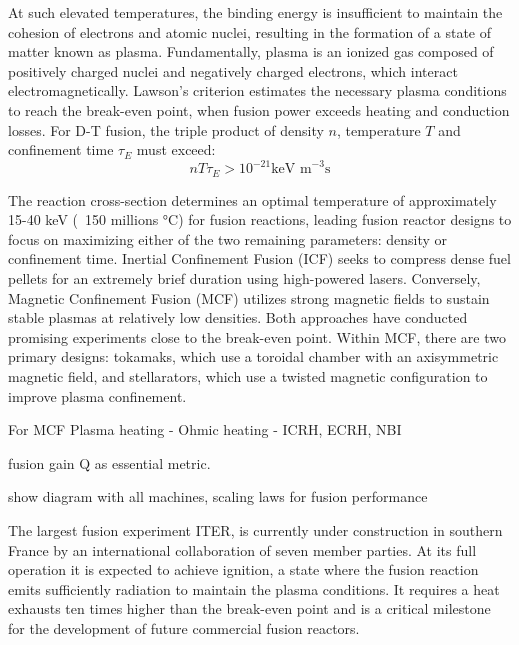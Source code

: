 At such elevated temperatures, the binding energy is insufficient to maintain the cohesion of electrons and atomic nuclei, resulting in the formation of a state of matter known as plasma. Fundamentally, plasma is an ionized gas composed of positively charged nuclei and negatively charged electrons, which interact electromagnetically. 
\newline
Lawson's criterion\cite{Lawson1957} estimates the necessary plasma conditions to reach the break-even point, when fusion power exceeds heating and conduction losses. For D-T fusion, the triple product of density $n$, temperature $T$ and confinement time $\tau_E$ must exceed:
\begin{equation}
	\label{eq:LawsonCriterionDT}
	nT\tau_E > 10^{-21} \text{keV m}^{-3}\text{s}
\end{equation}
 
The reaction cross-section determines an optimal temperature of approximately 15-40 keV  (~150 millions °C) for fusion reactions, leading fusion reactor designs to focus on maximizing either of the two remaining parameters: density or confinement time. Inertial Confinement Fusion (ICF) seeks to compress dense fuel pellets for an extremely brief duration using high-powered lasers. Conversely, Magnetic Confinement Fusion (MCF) utilizes strong magnetic fields to sustain stable plasmas at relatively low densities. Both approaches have conducted promising experiments close to the break-even point. Within MCF, there are two primary designs: tokamaks, which use a toroidal chamber with an axisymmetric magnetic field, and stellarators, which use a twisted magnetic configuration to improve plasma confinement.
\newline


For MCF
Plasma heating
- Ohmic heating
- ICRH, ECRH, NBI

fusion gain Q as essential metric.

show diagram with all machines, scaling laws for fusion performance

The largest fusion experiment ITER, is currently under construction in southern France by an international collaboration of seven member parties. At its full operation it is expected to achieve ignition, a state where the fusion reaction emits sufficiently radiation to maintain the plasma conditions. It requires a heat exhausts ten times higher than the break-even point and is a critical milestone for the development of future commercial fusion reactors. 

